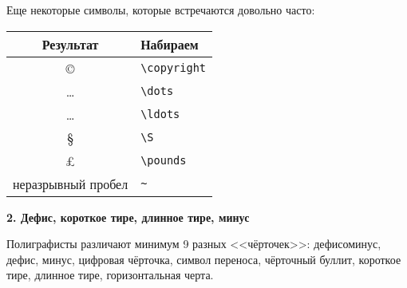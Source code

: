 \documentclass{article}
\begin{document}
Еще некоторые символы, которые встречаются довольно часто:

\begin{center}
\begin{tabular}{|c|l|}
\hline
\textbf{Результат}            & \textbf{Набираем}       \\ \hline
\copyright                    & \verb"\copyright"       \\
\dots                         & \verb"\dots"            \\
\ldots                        & \verb"\ldots"           \\
\S                            & \verb"\S"               \\
\pounds                       & \verb"\pounds"          \\
неразрывный пробел            & \verb"~"                \\ \hline
\end{tabular}
\end{center}

\vspace{1cm}

\textbf{2. Дефис, короткое тире, длинное тире, минус}

\bigskip

Полиграфисты различают минимум 9 разных <<чёрточек>>: дефисоминус, дефис, минус, цифровая чёрточка, символ переноса, чёрточный буллит, короткое тире, длинное тире, горизонтальная черта.
\end{document}
